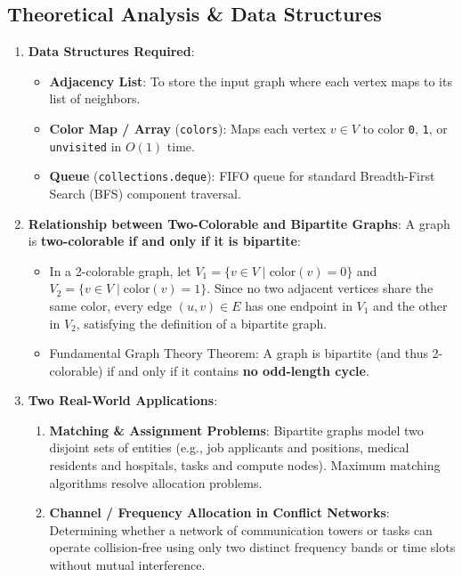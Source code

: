 \documentclass[12pt]{article}
\begin{document}
\subsection*{Theoretical Analysis \& Data Structures}
\begin{enumerate}
    \item \textbf{Data Structures Required}:
    \begin{itemize}
        \item \textbf{Adjacency List}: To store the input graph where each vertex maps to its list of neighbors.
        \item \textbf{Color Map / Array} (\texttt{colors}): Maps each vertex $v \in V$ to color \texttt{0}, \texttt{1}, or \texttt{unvisited} in $O(1)$ time.
        \item \textbf{Queue} (\texttt{collections.deque}): FIFO queue for standard Breadth-First Search (BFS) component traversal.
    \end{itemize}
    
    \item \textbf{Relationship between Two-Colorable and Bipartite Graphs}:
    A graph is \textbf{two-colorable if and only if it is bipartite}:
    \begin{itemize}
        \item In a 2-colorable graph, let $V_1 = \{v \in V \mid \text{color}(v) = 0\}$ and $V_2 = \{v \in V \mid \text{color}(v) = 1\}$. Since no two adjacent vertices share the same color, every edge $(u, v) \in E$ has one endpoint in $V_1$ and the other in $V_2$, satisfying the definition of a bipartite graph.
        \item Fundamental Graph Theory Theorem: A graph is bipartite (and thus 2-colorable) if and only if it contains \textbf{no odd-length cycle}.
    \end{itemize}
    
    \item \textbf{Two Real-World Applications}:
    \begin{enumerate}
        \item \textbf{Matching \& Assignment Problems}: Bipartite graphs model two disjoint sets of entities (e.g., job applicants and positions, medical residents and hospitals, tasks and compute nodes). Maximum matching algorithms resolve allocation problems.
        \item \textbf{Channel / Frequency Allocation in Conflict Networks}: Determining whether a network of communication towers or tasks can operate collision-free using only two distinct frequency bands or time slots without mutual interference.
    \end{enumerate}
\end{enumerate}
\end{document}
